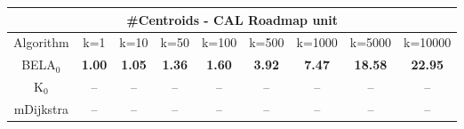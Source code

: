 \begin{tabular}{c|cccccccc}\toprule
\multicolumn{9}{c}{#Centroids - CAL Roadmap unit}\\ \midrule
Algorithm & k=1 & k=10 & k=50 & k=100 & k=500 & k=1000 & k=5000 & k=10000 \\ \midrule
BELA$_0$ & \textbf{1.00} & \textbf{1.05} & \textbf{1.36} & \textbf{1.60} & \textbf{3.92} & \textbf{7.47} & \textbf{18.58} & \textbf{22.95} \\
K$_0$ & -- & -- & -- & -- & -- & -- & -- & -- \\
mDijkstra & -- & -- & -- & -- & -- & -- & -- & -- \\ \bottomrule 
\end{tabular}
